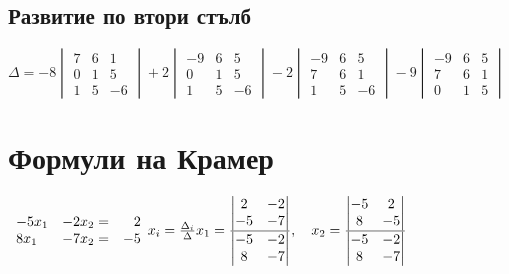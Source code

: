 \documentclass{article}
\begin{document}
    \subsection{Развитие по втори стълб}
    \(\Delta = -8 \begin{vmatrix}
        7 & 6 & 1\\
        0 & 1 & 5\\
        1 & 5 & -6
    \end{vmatrix} + 2 \begin{vmatrix}
        -9 & 6 & 5\\
        0 & 1 & 5\\
        1 & 5 & -6
    \end{vmatrix} - 2 \begin{vmatrix}
        -9 & 6 & 5\\
        7 & 6 & 1\\
        1 & 5 & -6
    \end{vmatrix} - 9 \begin{vmatrix}
        -9 & 6 & 5\\
        7 & 6 & 1\\
        0 & 1 & 5
    \end{vmatrix}\)
    \section{Формули на Крамер}
    \(\begin{array}{lcr}
        -5x_1 & -2x_2 = & 2\\
        8x_1 & -7x_2 = & - 5
    \end{array}\\\\
    x_i = \frac{\Delta_{i}}{\Delta}\\\\
    x_1 = \frac{\begin{vmatrix}
        2 & -2\\
        -5 & -7
    \end{vmatrix}}{\begin{vmatrix}
        -5 & -2\\
        8 & -7
    \end{vmatrix}}, \quad  x_2 = \frac{\begin{vmatrix}
        -5 & 2\\
        8 & -5
    \end{vmatrix}}{\begin{vmatrix}
        -5 & -2\\
        8 & -7
    \end{vmatrix}}\)
\end{document}

